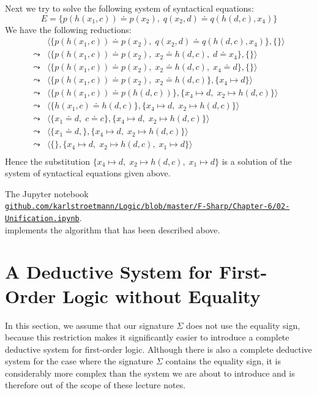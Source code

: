 \exampleEng
Next we try to solve the following system of syntactical equations: 
\[ E = \big\{ p(h(x_1,c)) \doteq p(x_2),\; q(x_2, d) \doteq q(h(d,c),x_4) \big\} \]
We have the following reductions:
$$
\begin{array}{ll}
          & \big\langle \big\{ p(h(x_1,c)) \doteq p(x_2),\; q(x_2, d) \doteq q(h(d,c),x_4) \big\}, \{ \} \big\rangle \\[0.2cm]
 \leadsto & \big\langle \big\{ p(h(x_1,c)) \doteq p(x_2),\; x_2 \doteq h(d,c), \; d \doteq x_4 \big\}, \{ \} \big\rangle \\[0.2cm]
 \leadsto & \big\langle \big\{ p(h(x_1,c)) \doteq p(x_2),\; x_2 \doteq h(d,c), \; x_4 \doteq d \big\}, \{ \} \big\rangle \\[0.2cm]
 \leadsto & \big\langle \big\{ p(h(x_1,c)) \doteq p(x_2),\; x_2 \doteq h(d,c) \big\}, \{ x_4 \mapsto d \} \big\rangle \\[0.2cm]
 \leadsto & \big\langle \big\{ p(h(x_1,c)) \doteq p(h(d,c)) \big\}, \{ x_4 \mapsto d,\; x_2 \mapsto h(d,c) \} \big\rangle \\[0.2cm]
 \leadsto & \big\langle \big\{ h(x_1,c) \doteq h(d,c) \big\}, \{ x_4 \mapsto d,\; x_2 \mapsto h(d,c) \} \big\rangle \\[0.2cm]
 \leadsto & \big\langle \big\{ x_1 \doteq d,\; c \doteq c \big\}, \{ x_4 \mapsto d,\; x_2 \mapsto h(d,c) \} \big\rangle \\[0.2cm]
 \leadsto & \big\langle \big\{ x_1 \doteq d,\big\}, \{ x_4 \mapsto d,\; x_2 \mapsto h(d,c) \} \big\rangle \\[0.2cm]
 \leadsto & \big\langle \big\{\big\}, \{ x_4 \mapsto d,\; x_2 \mapsto h(d,c),\; x_1 \mapsto d \} \big\rangle \\[0.2cm]
\end{array}
$$
Hence the  substitution  $\{ x_4 \mapsto d,\; x_2 \mapsto h(d,c),\; x_1 \mapsto d \}$ is a solution
of the system of syntactical equations given above.
\eox


\noindent
The Jupyter notebook
\\[0.2cm]
\href{https://github.com/karlstroetmann/Logic/blob/master/F-Sharp/Chapter-6/02-Unification.ipynb}{\small\texttt{github.com/karlstroetmann/Logic/blob/master/F-Sharp/Chapter-6/02-Unification.ipynb}}.
\\[0.2cm]
implements the algorithm that has been described above.

\section{A Deductive System for First-Order Logic without Equality \label{sec:fol-calculus}}
In this section, we assume that our signature $\Sigma$ does not use the equality sign, because this restriction
makes it significantly easier to introduce a complete deductive system for first-order logic. Although there is
also a complete deductive system for the case where the signature $\Sigma$ contains the equality sign, it is
considerably more complex than the system we are about to introduce and is therefore out of the scope of these
lecture notes. 

